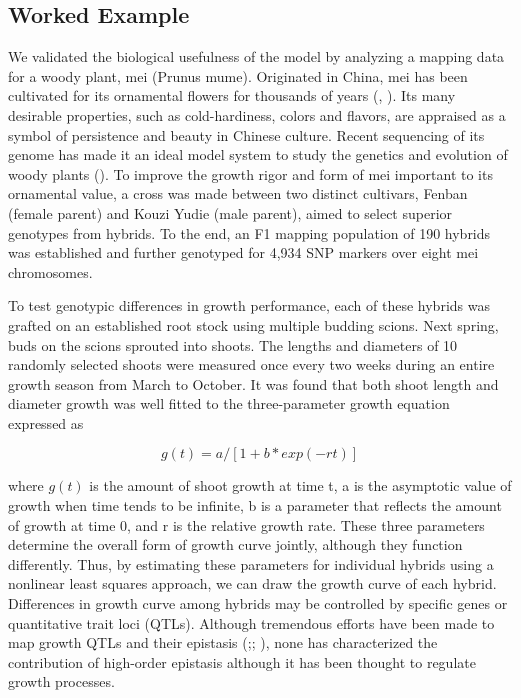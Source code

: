 \documentclass[11pt,]{book}
\theoremstyle{definition}
\theoremstyle{definition}
\theoremstyle{remark}
\begin{document}
\subsection{Worked Example}\label{worked-example}

We validated the biological usefulness of the model by analyzing a
mapping data for a woody plant, mei (Prunus mume). Originated in China,
mei has been cultivated for its ornamental flowers for thousands of
years (\cite{sun2013genome}, \cite{sun2014genetic}). Its many desirable
properties, such as cold-hardiness, colors and flavors, are appraised as
a symbol of persistence and beauty in Chinese culture. Recent sequencing
of its genome has made it an ideal model system to study the genetics
and evolution of woody plants (\cite{zhang2013epigenetic}). To improve
the growth rigor and form of mei important to its ornamental value, a
cross was made between two distinct cultivars, Fenban (female parent)
and Kouzi Yudie (male parent), aimed to select superior genotypes from
hybrids. To the end, an F1 mapping population of 190 hybrids was
established and further genotyped for 4,934 SNP markers over eight mei
chromosomes.

To test genotypic differences in growth performance, each of these
hybrids was grafted on an established root stock using multiple budding
scions. Next spring, buds on the scions sprouted into shoots. The
lengths and diameters of 10 randomly selected shoots were measured once
every two weeks during an entire growth season from March to October. It
was found that both shoot length and diameter growth was well fitted to
the three-parameter growth equation expressed as

\begin{equation}
g(t) = a/[1+b*exp(-rt)]
\label{eq:growth-curve}
\end{equation}

where \(g(t)\) is the amount of shoot growth at time t, a is the
asymptotic value of growth when time tends to be infinite, b is a
parameter that reflects the amount of growth at time 0, and r is the
relative growth rate. These three parameters determine the overall form
of growth curve jointly, although they function differently. Thus, by
estimating these parameters for individual hybrids using a nonlinear
least squares approach, we can draw the growth curve of each hybrid.
Differences in growth curve among hybrids may be controlled by specific
genes or quantitative trait loci (QTLs). Although tremendous efforts
have been made to map growth QTLs and their epistasis
(\cite{ma2002response};\cite{wu2006functional};
\cite{li2012estimation}), none has characterized the contribution of
high-order epistasis although it has been thought to regulate growth
processes.
\end{document}
